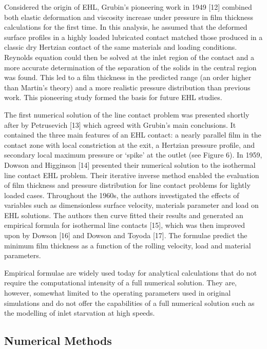 Considered the origin of EHL, Grubin’s pioneering work in 1949 [12] combined both elastic deformation and viscosity increase under pressure in film thickness calculations for the first time. In this analysis, he assumed that the deformed surface profiles in a highly loaded lubricated contact matched those produced in a classic dry Hertzian contact of the same materials and loading conditions. Reynolds equation could then be solved at the inlet region of the contact and a more accurate determination of the separation of the solids in the central region was found. This led to a film thickness in the predicted range (an order higher than Martin’s theory) and a more realistic pressure distribution than previous work. This pioneering study formed the basis for future EHL studies.

The first numerical solution of the line contact problem was presented shortly after by Petrusevich [13] which agreed with Grubin’s main conclusions. It contained the three main features of an EHL contact: a nearly parallel film in the contact zone with local constriction at the exit, a Hertzian pressure profile, and secondary local maximum pressure or ‘spike’ at the outlet (see Figure 6). In 1959, Dowson and Higginson [14] presented their numerical solution to the isothermal line contact EHL problem. Their iterative inverse method enabled the evaluation of film thickness and pressure distribution for line contact problems for lightly loaded cases. Throughout the 1960s, the authors investigated the effects of variables such as dimensionless surface velocity, materials parameter and load on EHL solutions. The authors then curve fitted their results and generated an empirical formula for isothermal line contacts [15], which was then improved upon by Dowson [16] and Dowson and Toyoda [17]. The formulae predict the minimum film thickness as a function of the rolling velocity, load and material parameters.

Empirical formulae are widely used today for analytical calculations that do not require the computational intensity of a full numerical solution. They are, however, somewhat limited to the operating parameters used in original simulations and do not offer the capabilities of a full numerical solution such as the modelling of inlet starvation at high speeds.

\subsection{Numerical Methods}

